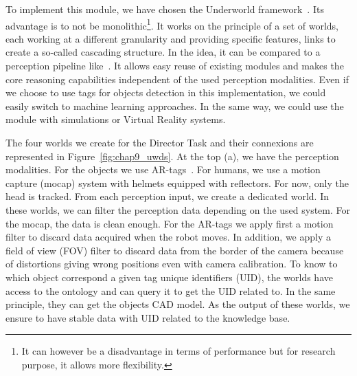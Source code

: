To implement this module, we have chosen the Underworld framework~\cite{lemaignan_2018_underworlds}. Its advantage is to not be monolithic\footnote{It can however be a disadvantage in terms of performance but for research purpose, it allows more flexibility.}. It works on the principle of a set of worlds, each working at a different granularity and providing specific features, links to create a so-called cascading structure. In the idea, it can be compared to a perception pipeline like~\cite{beetz_2015_robosherlock}. It allows easy reuse of existing modules and makes the core reasoning capabilities independent of the used perception modalities. Even if we choose to use tags for objects detection in this implementation, we could easily switch to machine learning approaches. In the same way, we could use the module with simulations or Virtual Reality systems.

The four worlds we create for the Director Task and their connexions are represented in Figure~\ref{fig:chap9_uwds}. At the top (a), we have the perception modalities. For the objects we use AR-tags~\cite{fiala_2005_artag}. For humans, we use a motion capture (mocap) system with helmets equipped with reflectors. For now, only the head is tracked. From each perception input, we create a dedicated world. In these worlds, we can filter the perception data depending on the used system. For the mocap, the data is clean enough. For the AR-tags we apply first a motion filter to discard data acquired when the robot moves. In addition, we apply a field of view (FOV) filter to discard data from the border of the camera because of distortions giving wrong positions even with camera calibration. To know to which object correspond a given tag unique identifiers (UID), the worlds have access to the ontology and can query it to get the UID related to. In the same principle, they can get the objects CAD model. As the output of these worlds, we ensure to have stable data with UID related to the knowledge base.

